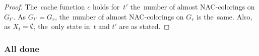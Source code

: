 \subsubsection*{\RootNode{}}

%
%
\begin{proof}
	The~cache function \( c \) holds for~\( t' \) the~number of almost NAC-colorings on \( G_{t'} \).
	As \( G_{t'} = G_r \), the~number of almost NAC-colorings on \( G_r \) is the~same.
	Also, as \( X_t = \emptyset \), the~only state in~\( t \) and \( t' \) are as stated.
\end{proof}
%

\subsubsection*{All done}

